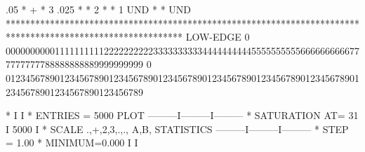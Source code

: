 \begin{Listing}
      .05   *                                                                    +                                     *   3
      .025  *                                                                                                          *   2
            *                                                                                                          *   1
   UND      *                                                                                                          * UND
            ************************************************************************************************************
 LOW-EDGE   0   0000000000111111111122222222223333333333444444444455555555556666666666777777777788888888889999999999
            0   0123456789012345678901234567890123456789012345678901234567890123456789012345678901234567890123456789
 
  *                                                          I         I
  * ENTRIES =     5000                   PLOT       ---------I---------I---------
  * SATURATION  AT=           31                             I 5000    I
  * SCALE  .,+,2,3,.,., A,B,           STATISTICS   ---------I---------I---------
  * STEP = 1.00     * MINIMUM=0.000                          I         I
\end{Listing}

